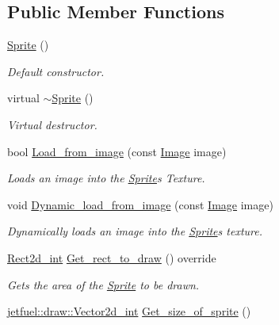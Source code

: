 \subsection*{Public Member Functions}
\begin{DoxyCompactItemize}
\item 
\hyperlink{classjetfuel_1_1draw_1_1Sprite_a108a6509a5d4b86e69942788d4401213}{Sprite} ()
\begin{DoxyCompactList}\small\item\em Default constructor. \end{DoxyCompactList}\item 
virtual \hyperlink{classjetfuel_1_1draw_1_1Sprite_ac13ffb7365f120f4e679ed547ea704cd}{$\sim$\+Sprite} ()
\begin{DoxyCompactList}\small\item\em Virtual destructor. \end{DoxyCompactList}\item 
bool \hyperlink{classjetfuel_1_1draw_1_1Sprite_a370d0b3b2770348ae57ae5156c59a0ca}{Load\+\_\+from\+\_\+image} (const \hyperlink{classjetfuel_1_1draw_1_1Image}{Image} image)
\begin{DoxyCompactList}\small\item\em Loads an image into the \hyperlink{classjetfuel_1_1draw_1_1Sprite}{Sprite}\textquotesingle{}s Texture. \end{DoxyCompactList}\item 
void \hyperlink{classjetfuel_1_1draw_1_1Sprite_ac7d3ecd6736a3dfb6af35fd099efec8b}{Dynamic\+\_\+load\+\_\+from\+\_\+image} (const \hyperlink{classjetfuel_1_1draw_1_1Image}{Image} image)
\begin{DoxyCompactList}\small\item\em Dynamically loads an image into the \hyperlink{classjetfuel_1_1draw_1_1Sprite}{Sprite}\textquotesingle{}s texture. \end{DoxyCompactList}\item 
\hyperlink{classjetfuel_1_1draw_1_1Rect2d}{Rect2d\+\_\+int} \hyperlink{classjetfuel_1_1draw_1_1Sprite_a2cd3f83c4fc573be82d3dc3a9c70e317}{Get\+\_\+rect\+\_\+to\+\_\+draw} () override
\begin{DoxyCompactList}\small\item\em Gets the area of the \hyperlink{classjetfuel_1_1draw_1_1Sprite}{Sprite} to be drawn. \end{DoxyCompactList}\item 
\hyperlink{classjetfuel_1_1draw_1_1Vector2d}{jetfuel\+::draw\+::\+Vector2d\+\_\+int} \hyperlink{classjetfuel_1_1draw_1_1Sprite_ad79f542ad5da9713048a80595629272a}{Get\+\_\+size\+\_\+of\+\_\+sprite} ()

\end{DoxyCompactItemize}
